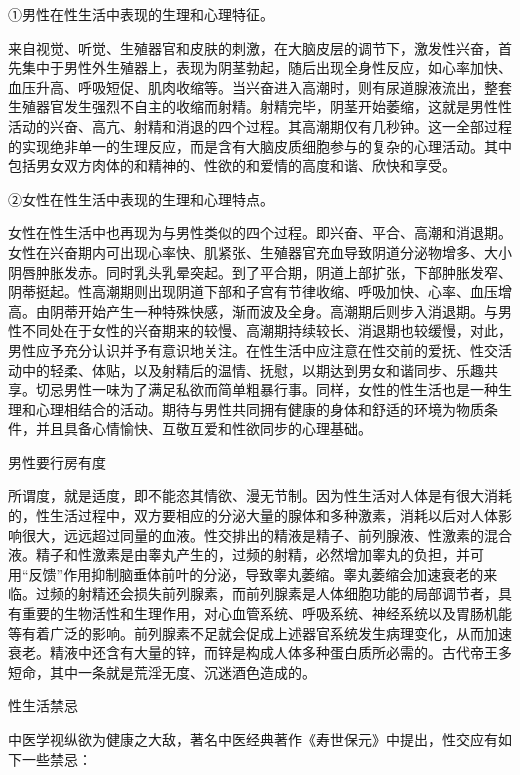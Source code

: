 \documentclass[12pt,UTF8]{ctexbook}
\begin{document}
①男性在性生活中表现的生理和心理特征。

来自视觉、听觉、生殖器官和皮肤的刺激，在大脑皮层的调节下，激发性兴奋，首先集中于男性外生殖器上，表现为阴茎勃起，随后出现全身性反应，如心率加快、血压升高、呼吸短促、肌肉收缩等。当兴奋进入高潮时，则有尿道腺液流出，整套生殖器官发生强烈不自主的收缩而射精。射精完毕，阴茎开始萎缩，这就是男性性活动的兴奋、高亢、射精和消退的四个过程。其高潮期仅有几秒钟。这一全部过程的实现绝非单一的生理反应，而是含有大脑皮质细胞参与的复杂的心理活动。其中包括男女双方肉体的和精神的、性欲的和爱情的高度和谐、欣快和享受。

②女性在性生活中表现的生理和心理特点。

女性在性生活中也再现为与男性类似的四个过程。即兴奋、平合、高潮和消退期。女性在兴奋期内可出现心率快、肌紧张、生殖器官充血导致阴道分泌物增多、大小阴唇肿胀发赤。同时乳头乳晕突起。到了平合期，阴道上部扩张，下部肿胀发窄、阴蒂挺起。性高潮期则出现阴道下部和子宫有节律收缩、呼吸加快、心率、血压增高。由阴蒂开始产生一种特殊快感，渐而波及全身。高潮期后则步入消退期。与男性不同处在于女性的兴奋期来的较慢、高潮期持续较长、消退期也较缓慢，对此，男性应予充分认识并予有意识地关注。在性生活中应注意在性交前的爱抚、性交活动中的轻柔、体贴，以及射精后的温情、抚慰，以期达到男女和谐同步、乐趣共享。切忌男性一味为了满足私欲而简单粗暴行事。同样，女性的性生活也是一种生理和心理相结合的活动。期待与男性共同拥有健康的身体和舒适的环境为物质条件，并且具备心情愉快、互敬互爱和性欲同步的心理基础。





男性要行房有度


所谓度，就是适度，即不能恣其情欲、漫无节制。因为性生活对人体是有很大消耗的，性生活过程中，双方要相应的分泌大量的腺体和多种激素，消耗以后对人体影响很大，远远超过同量的血液。性交排出的精液是精子、前列腺液、性激素的混合液。精子和性激素是由睾丸产生的，过频的射精，必然增加睾丸的负担，并可用“反馈”作用抑制脑垂体前叶的分泌，导致睾丸萎缩。睾丸萎缩会加速衰老的来临。过频的射精还会损失前列腺素，而前列腺素是人体细胞功能的局部调节者，具有重要的生物活性和生理作用，对心血管系统、呼吸系统、神经系统以及胃肠机能等有着广泛的影响。前列腺素不足就会促成上述器官系统发生病理变化，从而加速衰老。精液中还含有大量的锌，而锌是构成人体多种蛋白质所必需的。古代帝王多短命，其中一条就是荒淫无度、沉迷酒色造成的。





性生活禁忌


中医学视纵欲为健康之大敌，著名中医经典著作《寿世保元》中提出，性交应有如下一些禁忌：
\end{document}
